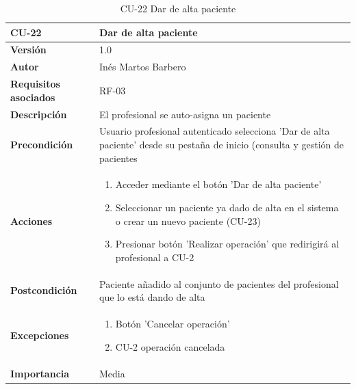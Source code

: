 \begin{table}[p]
	\centering
	\begin{tabularx}{\linewidth}{ p{} p{} }
		\toprule
		\textbf{CU-22}    & \textbf{Dar de alta paciente}\\
		\toprule
		\textbf{Versión}              & 1.0    \\
		\textbf{Autor}                & Inés Martos Barbero \\
		\textbf{Requisitos asociados} & RF-03 \\
		\textbf{Descripción}          & El profesional se auto-asigna un paciente \\
		\textbf{Precondición}         & Usuario profesional autenticado selecciona 'Dar de alta paciente' desde su pestaña de inicio (consulta y gestión de pacientes \\
		\textbf{Acciones}             &
		\begin{enumerate}
			\def\labelenumi{\arabic{enumi}.}
			\tightlist
			\item Acceder mediante el botón 'Dar de alta paciente'
			\item Seleccionar un paciente ya dado de alta en el sistema o crear un nuevo paciente (CU-23)
            \item Presionar botón 'Realizar operación' que redirigirá al profesional a CU-2
		\end{enumerate}\\
		\textbf{Postcondición}        & Paciente añadido al conjunto de pacientes del profesional que lo está dando de alta \\
		\textbf{Excepciones}          & 
        \begin{enumerate}
			\def\labelenumi{\arabic{enumi}.}
			\tightlist
			\item Botón 'Cancelar operación'
            \item CU-2 operación cancelada
		\end{enumerate}\\
		\textbf{Importancia}          & Media\\
		\bottomrule
	\end{tabularx}
	\caption{CU-22 Dar de alta paciente}
    \label{CU-22}
\end{table}

